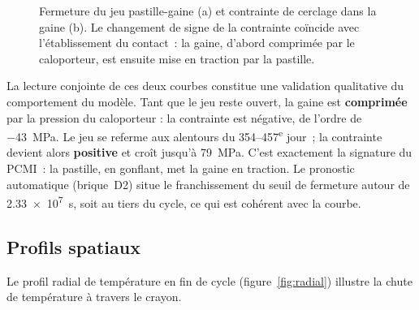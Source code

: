\documentclass[12pt,a4paper,french]{report}
\begin{document}
\begin{figure}[htbp]
\begin{minipage}{0.48\textwidth}
\end{minipage}
\caption[Fermeture du jeu et contrainte de cerclage]{Fermeture du jeu pastille-gaine (a) et contrainte de cerclage dans la
gaine (b). Le changement de signe de la contrainte coïncide avec
l'établissement du contact~: la gaine, d'abord comprimée par le caloporteur,
est ensuite mise en traction par la pastille.}
\label{fig:gap-stress}
\end{figure}

La lecture conjointe de ces deux courbes constitue une validation qualitative
du comportement du modèle. Tant que le jeu reste ouvert, la gaine est
\textbf{comprimée} par la pression du caloporteur : la contrainte est négative,
de l'ordre de \SI{-43}{\mega\pascal}. Le jeu se referme aux alentours du
\numrange{354}{457}\textsuperscript{e} jour~; la contrainte devient alors
\textbf{positive} et croît jusqu'à \SI{79}{\mega\pascal}. C'est exactement la
signature du PCMI~: la pastille, en gonflant, met la gaine en traction. Le
pronostic automatique (brique~D2) situe le franchissement du seuil de fermeture
autour de \SI{2.33e7}{\second}, soit au tiers du cycle, ce qui est cohérent avec
la courbe.

\subsection{Profils spatiaux}

Le profil radial de température en fin de cycle (figure~\ref{fig:radial})
illustre la chute de température à travers le crayon.
\end{document}

